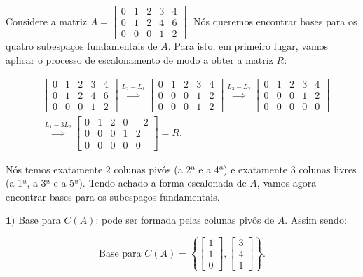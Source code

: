 \begin{Example}
	Considere a matriz $A = \begin{bmatrix}
		0 & 1 & 2 & 3 & 4 \\
		0 & 1 & 2 & 4 & 6 \\
		0 & 0 & 0 & 1 & 2
	\end{bmatrix}$. Nós queremos encontrar bases para os quatro subespaços fundamentais de $A$. Para isto, em primeiro lugar, vamos aplicar o processo de escalonamento de modo a obter a matriz $R$:
	
	$$
	\begin{aligned}
		&\begin{bmatrix}
			0 & 1 & 2 & 3 & 4 \\
			0 & 1 & 2 & 4 & 6 \\
			0 & 0 & 0 & 1 & 2
		\end{bmatrix}\overset{L_2 - L_1}{\implies}\begin{bmatrix}
			0 & 1 & 2 & 3 & 4 \\
			0 & 0 & 0 & 1 & 2 \\
			0 & 0 & 0 & 1 & 2
		\end{bmatrix}\overset{L_3 - L_2}{\implies}\begin{bmatrix}
			0 & 1 & 2 & 3 & 4 \\
			0 & 0 & 0 & 1 & 2 \\
			0 & 0 & 0 & 0 & 0
		\end{bmatrix} \\
		&\overset{L_1 - 3L_2}{\implies}\begin{bmatrix}
			0 & 1 & 2 & 0 & -2 \\
			0 & 0 & 0 & 1 & 2 \\
			0 & 0 & 0 & 0 & 0
		\end{bmatrix} = R.
	\end{aligned}
	$$
	
	Nós temos exatamente $2$ colunas pivôs (a 2ª e a 4ª) e exatamente $3$ colunas livres (a 1ª, a 3ª e a 5ª). Tendo achado a forma escalonada de $A$, vamos agora encontrar bases para os subespaços fundamentais.
	
	$\mathbf{1)}$ Base para $C(A)$: pode ser formada pelas colunas pivôs de $A$. Assim sendo:
	
	$$
	\text{Base para $C(A)$} = \left\{\begin{bmatrix}
		1 \\
		1 \\
		0
	\end{bmatrix}, \begin{bmatrix}
		3 \\
		4 \\
		1
	\end{bmatrix}\right\}.
	$$
	

\end{Example}
